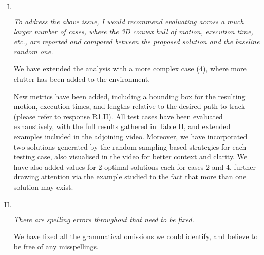 \documentclass[11pt]{article}
\newenvironment{reviewer}
{\begin{mdframed}[roundcorner = 10pt,fontcolor=blue!70!black]\itshape}
{\end{mdframed}}
\begin{document}
\begin{enumerate}[I.]

  \item $ $
 \begin{reviewer}
To address the above issue, I would recommend evaluating across a much larger number of cases, where the 3D convex hull of motion, execution time, etc., are reported and compared between the proposed solution and the baseline random one. 
   \end{reviewer}

We have extended the analysis with a more complex case (4), where more clutter has been added to the environment. 
\begin{comment}
\textcolor{blue}{This is of greater relevance to the difficulty in the solution when additional obstacles are present that the actual nature of individual obstacles in relation to their enveloping hull. }
\end{comment}
New metrics have been added, including a bounding box for the resulting motion, execution times, and lengths relative to the desired path to track (please refer to response R1.II).
All test cases have been evaluated exhaustively, with the full results gathered in Table II, and extended examples included in the adjoining video. %
Moreover, we have incorporated two solutions generated by the random sampling-based strategies for each testing case, also visualised in the video for better context and clarity. 
We have also added values for 2 optimal solutions each for cases 2 and 4, further drawing attention via the example studied to the fact that more than one solution may exist.  


  \item $ $
  \begin{reviewer}
	There are spelling errors throughout that need to be fixed. 
   \end{reviewer}

\noindent
We have fixed all the grammatical omissions we could identify, and believe to be free of any misspellings. 


\end{enumerate}
\end{document}
